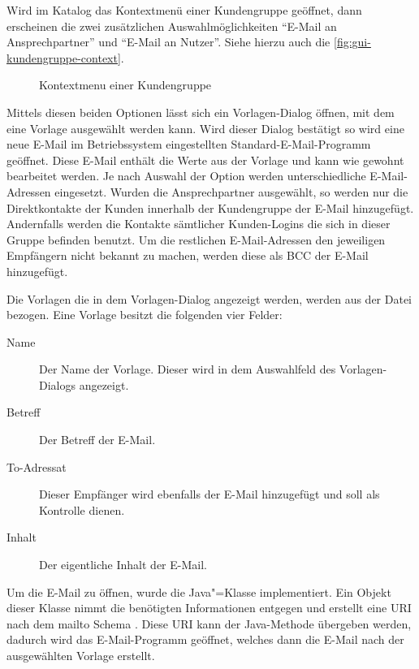 Wird im Katalog das Kontextmenü einer Kundengruppe geöffnet, dann erscheinen die zwei zusätzlichen Auswahlmöglichkeiten "`E-Mail an Ansprechpartner"' und "`E-Mail an Nutzer"'.
Siehe hierzu auch die \autoref{fig:gui-kundengruppe-context}.
\begin{figure}[htb]
	\centering
	\caption{Kontextmenu einer Kundengruppe}
	\label{fig:gui-kundengruppe-context}
\end{figure}
Mittels diesen beiden Optionen lässt sich ein Vorlagen-Dialog öffnen, mit dem eine Vorlage ausgewählt werden kann.
Wird dieser Dialog bestätigt so wird eine neue E-Mail im Betriebssystem eingestellten Standard-E-Mail-Programm geöffnet.
Diese E-Mail enthält die Werte aus der Vorlage und kann wie gewohnt bearbeitet werden.
Je nach Auswahl der Option werden unterschiedliche E-Mail-Adressen eingesetzt.
Wurden die Ansprechpartner ausgewählt, so werden nur die Direktkontakte der Kunden innerhalb der Kundengruppe der E-Mail hinzugefügt.
Andernfalls werden die Kontakte sämtlicher Kunden-Logins die sich in dieser Gruppe befinden benutzt.
Um die restlichen E-Mail-Adressen den jeweiligen Empfängern nicht bekannt zu machen, werden diese als BCC der E-Mail hinzugefügt.

Die Vorlagen die in dem Vorlagen-Dialog angezeigt werden, werden aus der Datei  bezogen. Eine Vorlage besitzt die folgenden vier Felder:
\begin{description}
\item[Name] Der Name der Vorlage. Dieser wird in dem Auswahlfeld des Vorlagen-Dialogs angezeigt.
\item[Betreff] Der Betreff der E-Mail.
\item[To-Adressat] Dieser Empfänger wird ebenfalls der E-Mail hinzugefügt und soll als Kontrolle dienen.
\item[Inhalt] Der eigentliche Inhalt der E-Mail.
\end{description}

Um die E-Mail zu öffnen, wurde die Java"=Klasse  implementiert.
Ein Objekt dieser Klasse nimmt die benötigten Informationen entgegen und erstellt eine URI nach dem mailto Schema \autocite{RFC2368}.
Diese URI kann der Java-Methode  \autocite{java-mailto} übergeben werden, dadurch wird das E-Mail-Programm geöffnet, welches dann die E-Mail nach der ausgewählten Vorlage erstellt.


